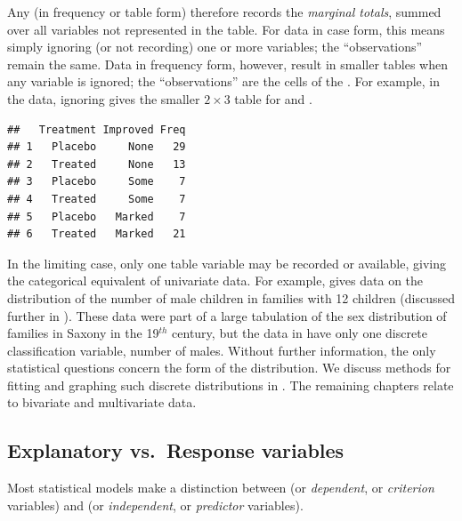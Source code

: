 \documentclass[11pt]{book}
\renewenvironment{knitrout}{\small\renewcommand{\baselinestretch}{.85}}{} %
\begin{document}
Any \ctab (in frequency or table form) therefore records the \emph{marginal totals}, summed over all
variables not represented in the table.
For data in case form, this means simply ignoring (or not recording)
one or more variables;  the ``observations'' remain the same.
Data in frequency form, however, result in smaller tables when
any variable is ignored;  the ``observations'' are the cells of
the \ctab. For example, in the  data, ignoring 
gives the smaller $2 \times 3$ table for  and .
\begin{knitrout}
\color{fgcolor}\begin{kframe}
\begin{alltt}
\hlstd{(}\hlstd{(}\hlopt{~} \hlopt{+}  
\end{alltt}
\begin{verbatim}
##   Treatment Improved Freq
## 1   Placebo     None   29
## 2   Treated     None   13
## 3   Placebo     Some    7
## 4   Treated     Some    7
## 5   Placebo   Marked    7
## 6   Treated   Marked   21
\end{verbatim}
\end{kframe}
\end{knitrout}


In the limiting case, only one table variable may be recorded or
available, giving the categorical equivalent of univariate data.
For example,  gives data on the distribution
of the number of male children in families with 12 children
(discussed further in ).
These data were part of a large tabulation of the sex distribution
of families in Saxony in the 19$^{th}$ century, but the data in 
have only one discrete classification variable, number of males.
Without further information, the only statistical questions concern
the form of the distribution.
We discuss methods for fitting and graphing such discrete distributions
in .
The remaining chapters relate to bivariate and multivariate data.


\subsection{Explanatory vs.\ Response variables}\label{sec:exp-resp}
Most statistical models make a distinction between 
(or \emph{dependent}, or \emph{criterion} variables)
and
(or \emph{independent}, or \emph{predictor} variables).
\end{document}
